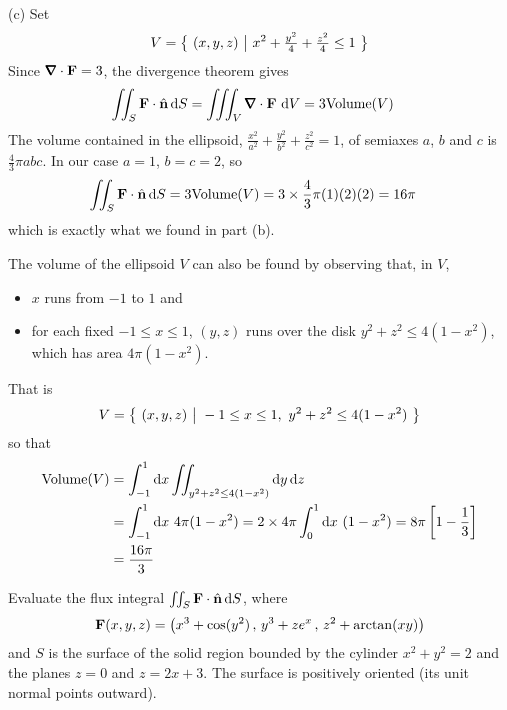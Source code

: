 \begin{solution}
\noindent (c)
Set
\begin{equation*}
V=\big\{ \ (x,y,z)\ \big|\ x^2 + \tfrac{y^2}{4} +\tfrac{z^2}{4} \le 1\ \big\}
\end{equation*}
Since $\vnabla\cdot\vF=3$, the divergence theorem gives
\begin{align*}
\dblInt_S \vF\cdot\hn\, \dee{S}
&=\tripInt_V \vnabla\cdot\vF\ \dee{V}
= 3 \text{Volume}(V)
\end{align*}
The volume contained in the ellipsoid, 
$\frac{x^2}{a^2} + \frac{y^2}{b^2} +\tfrac{z^2}{c^2}=1$, of semiaxes
$a$, $b$ and $c$ is $\frac{4}{3}\pi abc$. In our case $a=1$, $b=c=2$,
so 
\begin{align*}
\iint_S \mathbf{F}\cdot\hat{\mathbf{n}}\, \mathrm{d}S
&= 3 \text{Volume}(V)
=3\times \frac{4}{3}\pi (1)(2)(2)
=16\pi
\end{align*}
which is exactly what we found in part (b).

The volume of the ellipsoid $V$ can also be found by observing that,
in $V$,
\begin{itemize}\itemsep1pt \parskip0pt  %
\item
$x$ runs from $-1$ to $1$ and
\item for each fixed $-1\le x\le 1$, $(y,z)$ runs over the
   disk $y^2+z^2\le 4(1-x^2)$, which has area $4\pi (1-x^2)$.
\end{itemize}
That is
\begin{equation*}
V=\big\{ \ (x,y,z)\ \big|\ -1\le x\le 1,\  y^2+z^2 \le 4(1-x^2)\ \big\}
\end{equation*}
so that
\begin{align*}
\text{Volume}(V) &=\int_{-1}^1 \mathrm{d}x
           \iint_{y^2+z^2 \le 4(1-x^2)}\mathrm{d}y\,\mathrm{d}z \\
&= \int_{-1}^1 \mathrm{d}x\ 4\pi(1-x^2)
  =2\times 4\pi \int_0^1 \mathrm{d}x\ (1-x^2)
  =8\pi\left[1-\frac{1}{3}\right] \\
&=\frac{16\pi}{3}
\end{align*}

\end{solution}

\begin{question}[M317 2009A]  %
Evaluate the flux integral
$\iint_S \mathbf{F}\cdot\hat{\mathbf{n}}\, \mathrm{d}S$, where
\begin{equation*}
  \mathbf{F}(x,y,z) = \big(x^3 + \cos(y^2)\,,\, y^3 + ze^x\,,\, z^2 + \arctan(xy)\big) 
\end{equation*}
and $S$ is the surface of the solid region bounded by the cylinder 
$x^2 + y^2 = 2$ and the planes $z = 0$ and $z = 2x + 3$. 
The surface is positively oriented (its unit normal points outward).
\end{question}

